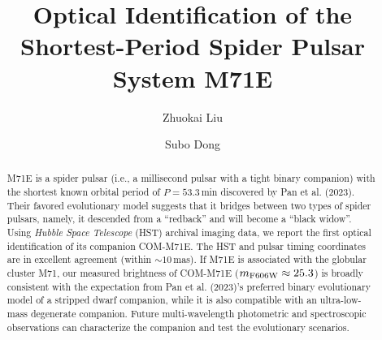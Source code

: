 \documentclass[twocolumn]{aastex631}
\begin{document}
\title{Optical Identification of the Shortest-Period Spider Pulsar System M71E}


\author{Zhuokai Liu}
\author{Subo Dong}

\begin{abstract}
M71E is a spider pulsar (i.e., a millisecond pulsar with a tight binary companion) with the shortest known orbital period of $P=53.3$\,min discovered by Pan et al. (2023). Their favored evolutionary model suggests that it bridges between two types of spider pulsars, namely, it descended from a ``redback'' and will become a ``black widow''. Using {\it Hubble Space Telescope} (HST) archival imaging data, we report the first optical identification of its companion COM-M71E. The HST and pulsar timing coordinates are in excellent agreement (within $\sim10$\,mas). If M71E is associated with the globular cluster M71, our measured brightness of COM-M71E ($m_{\rm F606W} \approx 25.3$) is broadly consistent with the expectation from Pan et al. (2023)'s preferred binary evolutionary model of a stripped dwarf companion, while it is also compatible with an ultra-low-mass degenerate companion. Future multi-wavelength photometric and spectroscopic observations can characterize the companion and test the evolutionary scenarios.
\end{abstract}

\end{document}
